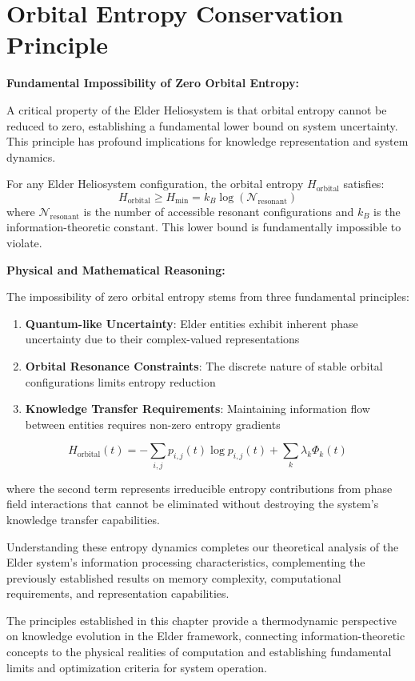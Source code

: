 \section{Orbital Entropy Conservation Principle}

\textbf{Fundamental Impossibility of Zero Orbital Entropy:}

A critical property of the Elder Heliosystem is that orbital entropy cannot be reduced to zero, establishing a fundamental lower bound on system uncertainty. This principle has profound implications for knowledge representation and system dynamics.

\begin{theorem}
For any Elder Heliosystem configuration, the orbital entropy $H_{\text{orbital}}$ satisfies:
\begin{equation}
H_{\text{orbital}} \geq H_{\min} = k_B \log(\mathcal{N}_{\text{resonant}})
\end{equation}
where $\mathcal{N}_{\text{resonant}}$ is the number of accessible resonant configurations and $k_B$ is the information-theoretic constant. This lower bound is fundamentally impossible to violate.
\end{theorem}

\textbf{Physical and Mathematical Reasoning:}

The impossibility of zero orbital entropy stems from three fundamental principles:
\begin{enumerate}
    \item \textbf{Quantum-like Uncertainty}: Elder entities exhibit inherent phase uncertainty due to their complex-valued representations
    \item \textbf{Orbital Resonance Constraints}: The discrete nature of stable orbital configurations limits entropy reduction
    \item \textbf{Knowledge Transfer Requirements}: Maintaining information flow between entities requires non-zero entropy gradients
\end{enumerate}

\begin{equation}
H_{\text{orbital}}(t) = -\sum_{i,j} p_{i,j}(t) \log p_{i,j}(t) + \sum_k \lambda_k \Phi_k(t)
\end{equation}

where the second term represents irreducible entropy contributions from phase field interactions that cannot be eliminated without destroying the system's knowledge transfer capabilities.

Understanding these entropy dynamics completes our theoretical analysis of the Elder system's information processing characteristics, complementing the previously established results on memory complexity, computational requirements, and representation capabilities.

The principles established in this chapter provide a thermodynamic perspective on knowledge evolution in the Elder framework, connecting information-theoretic concepts to the physical realities of computation and establishing fundamental limits and optimization criteria for system operation.